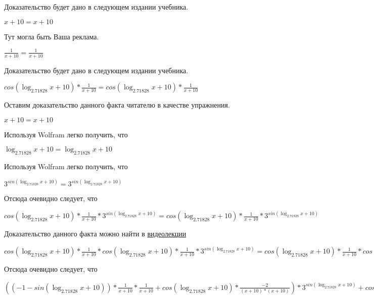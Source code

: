\documentclass[12pt,a4paper,fleqn]{article}
\theoremstyle{definition}
\begin{document}
Доказательство будет дано в следующем издании учебника.

$ x  +  10  =  x  +  10 $

Тут могла быть Ваша реклама.

$\frac{ 1 }{ x  +  10 }
 = \frac{ 1 }{ x  +  10 }
$

Доказательство будет дано в следующем издании учебника.

$cos(\log_{ 2.71828 }{ x  +  10 }) * \frac{ 1 }{ x  +  10 }
 = cos(\log_{ 2.71828 }{ x  +  10 }) * \frac{ 1 }{ x  +  10 }
$

Оставим доказательство данного факта читателю в качестве упражнения.

$ x  +  10  =  x  +  10 $

Используя Wolfram легко получить, что

$\log_{ 2.71828 }{ x  +  10 } = \log_{ 2.71828 }{ x  +  10 }$

Используя Wolfram легко получить, что

${ 3 }^{sin(\log_{ 2.71828 }{ x  +  10 })} = { 3 }^{sin(\log_{ 2.71828 }{ x  +  10 })}$

Отсюда очевидно следует, что

$cos(\log_{ 2.71828 }{ x  +  10 }) * \frac{ 1 }{ x  +  10 }
 * { 3 }^{sin(\log_{ 2.71828 }{ x  +  10 })} = cos(\log_{ 2.71828 }{ x  +  10 }) * \frac{ 1 }{ x  +  10 }
 * { 3 }^{sin(\log_{ 2.71828 }{ x  +  10 })}$

Доказательство данного факта можно найти в \href{https://www.youtube.com/watch?v=dQw4w9WgXcQ}{видеолекции}

$cos(\log_{ 2.71828 }{ x  +  10 }) * \frac{ 1 }{ x  +  10 }
 * cos(\log_{ 2.71828 }{ x  +  10 }) * \frac{ 1 }{ x  +  10 }
 * { 3 }^{sin(\log_{ 2.71828 }{ x  +  10 })} = cos(\log_{ 2.71828 }{ x  +  10 }) * \frac{ 1 }{ x  +  10 }
 * cos(\log_{ 2.71828 }{ x  +  10 }) * \frac{ 1 }{ x  +  10 }
 * { 3 }^{sin(\log_{ 2.71828 }{ x  +  10 })}$

Отсюда очевидно следует, что

$(( -1  - sin(\log_{ 2.71828 }{ x  +  10 })) * \frac{ 1 }{ x  +  10 }
 * \frac{ 1 }{ x  +  10 }
 + cos(\log_{ 2.71828 }{ x  +  10 }) * \frac{ -2 }{( x  +  10 ) * ( x  +  10 )}
) * { 3 }^{sin(\log_{ 2.71828 }{ x  +  10 })} + cos(\log_{ 2.71828 }{ x  +  10 }) * \frac{ 1 }{ x  +  10 }
 * cos(\log_{ 2.71828 }{ x  +  10 }) * \frac{ 1 }{ x  +  10 }
 * { 3 }^{sin(\log_{ 2.71828 }{ x  +  10 })} = (( -1  - sin(\log_{ 2.71828 }{ x  +  10 })) * \frac{ 1 }{ x  +  10 }
 * \frac{ 1 }{ x  +  10 }
 + cos(\log_{ 2.71828 }{ x  +  10 }) * \frac{ -2 }{( x  +  10 ) * ( x  +  10 )}
) * { 3 }^{sin(\log_{ 2.71828 }{ x  +  10 })} + cos(\log_{ 2.71828 }{ x  +  10 }) * \frac{ 1 }{ x  +  10 }
 * cos(\log_{ 2.71828 }{ x  +  10 }) * \frac{ 1 }{ x  +  10 }
 * { 3 }^{sin(\log_{ 2.71828 }{ x  +  10 })}$
\end{document}
